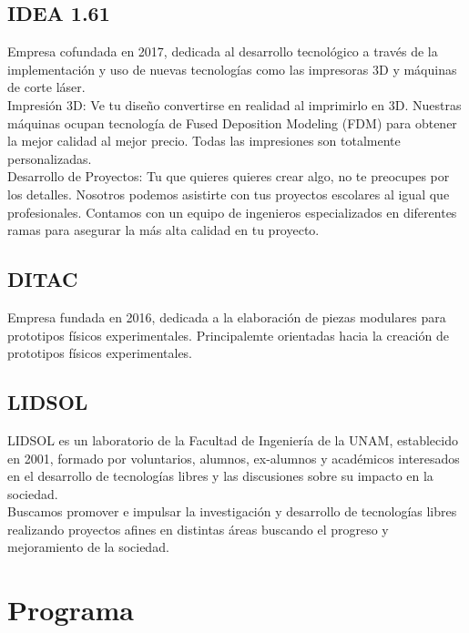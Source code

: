 \documentclass[]{article}
\begin{document}
\subsection{IDEA 1.61}

Empresa cofundada en 2017, dedicada al desarrollo tecnológico a través de la implementación y uso de nuevas tecnologías como las impresoras 3D y máquinas de corte láser.\\

Impresión 3D: Ve tu diseño convertirse en realidad al imprimirlo en 3D. Nuestras máquinas ocupan tecnología de Fused Deposition Modeling (FDM) para obtener la mejor calidad al mejor precio. Todas las impresiones son totalmente personalizadas.\\

Desarrollo de Proyectos: Tu que quieres quieres crear algo, no te preocupes por los detalles. Nosotros podemos asistirte con tus proyectos escolares al igual que profesionales. Contamos con un equipo de ingenieros especializados en diferentes ramas para asegurar la más alta calidad en tu proyecto.\\

\subsection{DITAC}

Empresa fundada en 2016, dedicada a la elaboración de piezas modulares para prototipos físicos experimentales. Principalemte orientadas hacia la creación de prototipos físicos experimentales.\\

\subsection{LIDSOL}

LIDSOL es un laboratorio de la Facultad de Ingeniería de la UNAM, establecido en 2001, formado por voluntarios, alumnos, ex-alumnos y académicos interesados en el desarrollo de tecnologías libres y las discusiones sobre su impacto en la sociedad.\\

Buscamos promover e impulsar la investigación y desarrollo de tecnologías libres realizando proyectos afines en distintas áreas buscando el progreso y mejoramiento de la sociedad.\\


\section{Programa}
\end{document}

